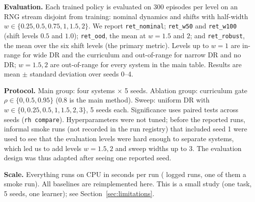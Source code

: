 \textbf{Evaluation.} Each trained policy is evaluated on 300 episodes per level on an RNG stream disjoint from training: nominal dynamics and shifts with half-width $w\in\{0.25,0.5,0.75,1,1.5,2\}$. We report \texttt{ret\_nominal}; \texttt{ret\_w50} and \texttt{ret\_w100} (shift levels $0.5$ and $1.0$); \texttt{ret\_ood}, the mean at $w=1.5$ and $2$; and \texttt{ret\_robust}, the mean over the six shift levels (the primary metric). Levels up to $w=1$ are in-range for wide DR and the curriculum and out-of-range for narrow DR and no DR; $w=1.5,2$ are out-of-range for every system in the main table. Results are mean $\pm$ standard deviation over seeds 0--4.

\textbf{Protocol.} Main group: four systems $\times$ 5 seeds. Ablation group: curriculum gate $\rho\in\{0,0.5,0.95\}$ (0.8 is the main method). Sweep: uniform DR with $w\in\{0,0.25,0.5,1,1.5,2,3\}$, 5 seeds each. Significance uses paired tests across seeds (\texttt{rh compare}). Hyperparameters were not tuned; before the reported runs, informal smoke runs (not recorded in the run registry) that included seed 1 were used to see that the evaluation levels were hard enough to separate systems, which led us to add levels $w=1.5,2$ and sweep widths up to 3. The evaluation design was thus adapted after seeing one reported seed.

\textbf{Scale.} Everything runs on CPU in seconds per run ( logged runs, one of them a smoke run). All baselines are reimplemented here. This is a small study (one task, 5 seeds, one learner); see Section~\ref{sec:limitations}.
